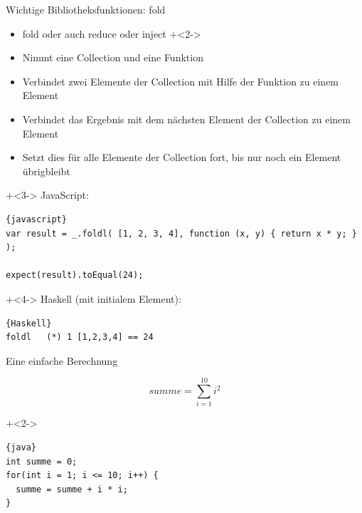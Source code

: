 \begin{frame}[fragile]{Wichtige Bibliotheksfunktionen: fold}
\begin{itemize}
\item fold oder auch reduce oder inject
\onslide+<2->
\item Nimmt eine Collection und eine Funktion
\item Verbindet zwei Elemente der Collection mit Hilfe der Funktion zu einem Element
\item Verbindet das Ergebnis mit dem nächsten Element der Collection zu einem Element
\item Setzt dies für alle Elemente der Collection fort, bis nur noch ein Element übrigbleibt
\end{itemize}

\onslide+<3->
JavaScript:
\begin{lstlisting}{javascript}
var result = _.foldl( [1, 2, 3, 4], function (x, y) { return x * y; } );

expect(result).toEqual(24);
\end{lstlisting}
\onslide+<4->
Haskell (mit initialem Element):
\begin{lstlisting}{Haskell}
foldl	(*) 1 [1,2,3,4] == 24
\end{lstlisting}

\end{frame}

\begin{frame}[fragile]{Eine einfache Berechnung}

\[
summe = \sum_{i=1}^{10}i^2
\]

\vspace{5em}

\onslide+<2->
\begin{lstlisting}{java}
int summe = 0;
for(int i = 1; i <= 10; i++) {
  summe = summe + i * i;
}
\end{lstlisting}
\end{frame}

